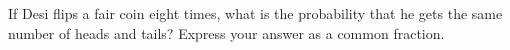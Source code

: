 If Desi flips a fair coin eight times, what is the probability that he gets the same number of heads and tails? Express your answer as a common fraction.
